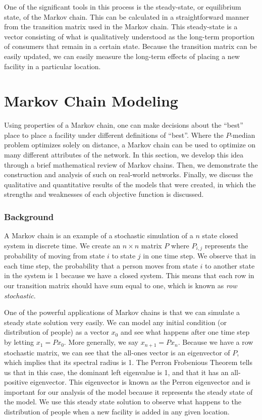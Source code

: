 \documentclass[twoside,twocolumn]{article}
\begin{document}
One of the significant tools in this process is the steady-state, or equilibrium state, of the Markov chain.
This can be calculated in a straightforward manner from the transition matrix used in the Markov chain.
This steady-state is a vector consisting of what is qualitatively understood as the long-term proportion of consumers that remain in a certain state. %
Because the transition matrix can be easily updated, we can easily measure the long-term effects of placing a new facility in a particular location.

\section{Markov Chain Modeling}

Using properties of a Markov chain, one can make decisions about the ``best'' place to place a facility under different definitions of ``best''.
Where the $P$-median problem optimizes solely on distance, a Markov chain can be used to optimize on many different attributes of the network.
In this section, we develop this idea through a brief mathematical review of Markov chains.
Then, we demonstrate the construction and analysis of such on real-world networks. %
Finally, we discuss the qualitative and quantitative results of the models that were created, in which the strengths and weaknesses of each objective function is discussed. %

\subsubsection{Background}

A Markov chain is an example of a stochastic simulation of a $n$ state closed system in discrete time.
We create an $n\times n$ matrix $P$ where $P_{i,j}$ represents the probability of moving from state $i$ to state $j$ in one time step.
We observe that in each time step, the probability that a person moves from state $i$ to another state in the system is 1 because we have a closed system.
This means that each row in our transition matrix should have sum equal to one, which is known as {\em row stochastic}. %

One of the powerful applications of Markov chains is that we can simulate a steady state solution very easily.
We can model any initial condition (or distribution of people) as a vector $x_0$ and see what happens after one time step by letting $x_1 = P x_0$.
More generally, we say $x_{n + 1} = P x_n$.
Because we have a row stochastic matrix, we can see that the all-ones vector is an eigenvector of $P$, which implies that its spectral radius is 1. %
The Perron Frobenious Theorem tells us that in this case, the dominant left eigenvalue is 1, and that it has an all-positive eigenvector.%
This eigenvector is known as the Perron eigenvector and is important for our analysis of the model because it represents the steady state of the model. %
We use this steady state solution to observe what happens to the distribution of people when a new facility is added in any given location.
\end{document}
